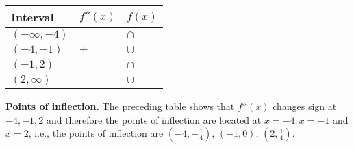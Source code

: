 {\begin{tabular}{|lll|}\hline
Interval & $f''(x)$ & $f(x)$   \\\hline
$(-\infty, -4)$ & $-$& $\cap$ \\\hline
$(-4, -1)$ &$+$&$\cup$\\\hline
$(-1, 2)$&$-$&$\cap$ \\\hline
$(2, \infty)$&$-$&$\cup$ \\\hline
\end{tabular}

\textbf{Points of inflection.} The preceding table shows that $f''(x)$ changes sign at $-4, -1, 2$ and therefore the points of inflection are located at $x=-4, x=-1$ and $x=2$, i.e., the points of inflection are $\left(-4, -\frac{1}{4}\right)$, $\left(-1, 0\right)$, $\left(2, \frac{1}{4}\right)$.

}